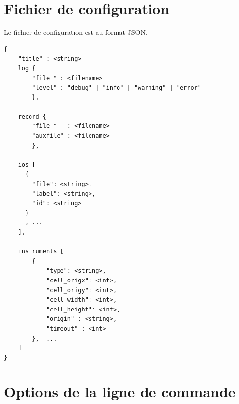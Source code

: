 \documentclass[a4paper,11pt]{report}
\begin{document}
\section{Fichier de configuration}\label{configfile}
Le fichier de configuration est au format JSON.
\\
\begin{verbatim}
{
	"title" : <string>
    log {
        "file " : <filename>
        "level" : "debug" | "info" | "warning" | "error" 
        },
    
    record {
	    "file "   : <filename>
        "auxfile" : <filename>
        },

    ios [
      {
        "file": <string>,
        "label": <string>,
        "id": <string>
      }
      , ... 
    ],
    
    instruments [
        {
            "type": <string>,
            "cell_origx": <int>,
            "cell_origy": <int>,
            "cell_width": <int>,
            "cell_height": <int>,
            "origin" : <string>,
            "timeout" : <int>
        },  ... 
    ]
} 
\end{verbatim}


\section{Options de la ligne de commande}\label{optionslignecommande}
\end{document}
